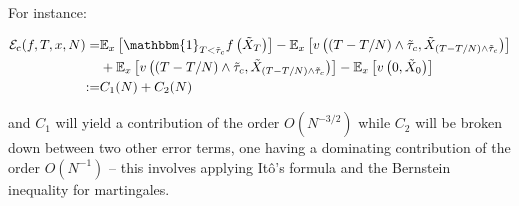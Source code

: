 For instance: 

\begin{align*}
\mathcal{E}_{\mathrm{c}}(f, T, x, N)= & \mathbb{E}_{x}\left[\mathbbm{1}_{T<\tilde{\tau}_{c}} f\left(\tilde{X}_{T}\right)\right]-\mathbb{E}_{x}\left[v\left((T-T / N) \wedge \tilde{\tau}_{c}, \tilde{X}_{(T-T / N) \wedge \tilde{\tau}_{c}}\right)\right] \\
& +\mathbb{E}_{x}\left[v\left((T-T / N) \wedge \tilde{\tau}_{c}, \tilde{X}_{(T-T / N) \wedge \tilde{\tau}_{c}}\right)\right]-\mathbb{E}_{x}\left[v\left(0, \tilde{X}_{0}\right)\right] \\
:= & C_{1}(N)+C_{2}(N)
\end{align*}

and $C_1$ will yield a contribution of the order $O(N^{-3/2})$ while $C_2$ will be broken down between two other error terms, one having a dominating contribution of the order $O(N^{-1})$ -- this involves applying Itô's formula and the Bernstein inequality for martingales.


